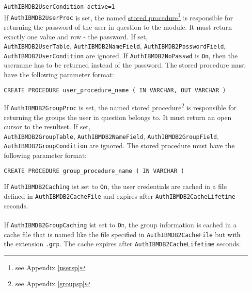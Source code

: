 \documentclass[11pt,letterpaper]{article}
\begin{document}
{\tt AuthIBMDB2UserCondition active=1}\\
\newpage
\noindent
If {\tt AuthIBMDB2UserProc} is set, the named \hyperlink{husersp}{stored procedure}\footnote{see Appendix \ref{usersp}} is responsible for returning the password of the user in question to the module. It must return exactly one value and row - the password. If set,\\ {\tt AuthIBMDB2UserTable}, {\tt AuthIBMDB2NameField}, {\tt AuthIBMDB2PasswordField}, {\tt AuthIBMDB2UserCondition} are ignored. If {\tt AuthIBMDB2NoPasswd} is {\tt On}, then the username has to be returned instead of the password. The stored procedure must have the following parameter format:
\begin{verbatim}
CREATE PROCEDURE user_procedure_name ( IN VARCHAR, OUT VARCHAR )
\end{verbatim}
If {\tt AuthIBMDB2GroupProc} is set, the named \hyperlink{hgroupsp}{stored procedure}\footnote{see Appendix \ref{groupsp}} is responsible for returning the groups the user in question belongs to. It must return an open cursor to the resultset. If set,\\ {\tt AuthIBMDB2GroupTable}, {\tt AuthIBMDB2NameField}, {\tt AuthIBMDB2GroupField}, {\tt AuthIBMDB2GroupCondition} are ignored. The stored procedure must have the following parameter format:
\begin{verbatim}
CREATE PROCEDURE group_procedure_name ( IN VARCHAR )
\end{verbatim}
If {\tt AuthIBMDB2Caching} ist set to {\tt On}, the user credentials are cached in a file defined in {\tt AuthIBMDB2CacheFile} and expires after {\tt AuthIBMDB2CacheLifetime} seconds.\\
\\
If {\tt AuthIBMDB2GroupCaching} ist set to {\tt On}, the group information is cached in a cache file that is named like the file specified in {\tt AuthIBMDB2CacheFile} but with the extension {\tt .grp}. The cache expires after {\tt AuthIBMDB2CacheLifetime} seconds.
\newpage
\end{document}
